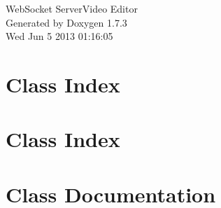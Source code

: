 \documentclass[a4paper]{book}
\begin{document}
\hypersetup{pageanchor=false}
\begin{titlepage}
\vspace*{7cm}
\begin{center}
{\Large WebSocket ServerVideo Editor }\\
\vspace*{1cm}
{\large Generated by Doxygen 1.7.3}\\
\vspace*{0.5cm}
{\small Wed Jun 5 2013 01:16:05}\\
\end{center}
\end{titlepage}
\clearemptydoublepage
{}
\tableofcontents
\clearemptydoublepage
{}
\hypersetup{pageanchor=true}
\chapter{Class Index}

\chapter{Class Index}

\chapter{Class Documentation}







































\printindex
\end{document}
